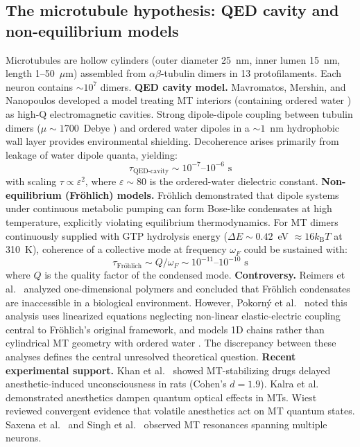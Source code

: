 \documentclass[twocolumn,10pt]{article}
\newcommand{\kB}{k_{\text{B}}}
\begin{document}
\subsection{The microtubule hypothesis: QED cavity and non-equilibrium models}
Microtubules are hollow cylinders (outer diameter 25~nm, inner lumen 15~nm,
length 1--50~$\mu$m) assembled from $\alpha\beta$-tubulin dimers in 13
protofilaments. Each neuron contains $\sim 10^7$ dimers.
\textbf{QED cavity model.} Mavromatos, Mershin, and Nanopoulos
\cite{Mavromatos2025,Mavromatos1997,Mavromatos2002} developed a model
treating MT interiors (containing ordered water
\cite{DelGiudice1988,Sahu2013}) as high-Q electromagnetic cavities. Strong
dipole-dipole coupling between tubulin dimers ($\mu \sim 1700$~Debye
\cite{Tuszynski1995}) and ordered water dipoles in a $\sim 1$~nm hydrophobic
wall layer provides environmental shielding. Decoherence arises primarily
from leakage of water dipole quanta, yielding:
\begin{equation}
\tau_{\text{QED-cavity}} \sim 10^{-7}\text{--}10^{-6}\text{~s}
\label{eq:cavity_tau}
\end{equation}
with scaling $\tau \propto \varepsilon^2$, where $\varepsilon \sim 80$ is
the ordered-water dielectric constant.
\textbf{Non-equilibrium (Fr\"ohlich) models.} Fr\"ohlich
\cite{Frohlich1968,Frohlich1977} demonstrated that dipole systems under
continuous metabolic pumping can form Bose-like condensates at high
temperature, explicitly violating equilibrium thermodynamics. For MT dimers
continuously supplied with GTP hydrolysis energy ($\Delta E \sim 0.42$~eV
$\approx 16\kB T$ at 310~K), coherence of a collective mode at frequency
$\omega_F$ could be sustained with:
\begin{equation}
\tau_{\text{Fr\"{o}hlich}} \sim Q / \omega_F \sim
10^{-11}\text{--}10^{-10}\text{~s}
\end{equation}
where $Q$ is the quality factor of the condensed mode.
\textbf{Controversy.} Reimers et al.\ \cite{Reimers2009} analyzed
one-dimensional polymers and concluded that Fr\"ohlich condensates are
inaccessible in a biological environment. However, Pokorn\'y et al.\
\cite{Pokorn2011} noted this analysis uses linearized equations neglecting
non-linear elastic-electric coupling central to Fr\"ohlich's original
framework, and models 1D chains rather than cylindrical MT geometry with
ordered water \cite{Mavromatos2025,Salari2011}. The discrepancy between
these analyses defines the central unresolved theoretical question.
\textbf{Recent experimental support.} Khan et al.\ \cite{Khan2024} showed
MT-stabilizing drugs delayed anesthetic-induced unconsciousness in rats
(Cohen's $d = 1.9$). Kalra et al.\ \cite{Kalra2023} demonstrated anesthetics
dampen quantum optical effects in MTs. Wiest \cite{Wiest2025} reviewed
convergent evidence that volatile anesthetics act on MT quantum states.
Saxena et al.\ \cite{Saxena2020} and Singh et al.\ \cite{Singh2021}
observed MT resonances spanning multiple neurons.
\end{document}
